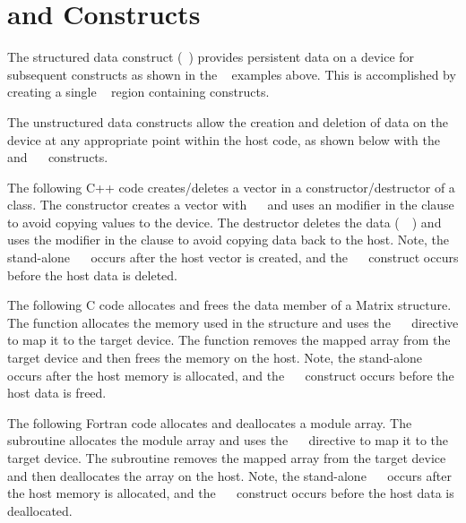 \pagebreak
\section{   and    Constructs}
\label{sec:target_enter_exit_data}

The structured data construct (~) provides persistent data on a
device for subsequent  constructs as shown in the 
~ examples above. This is accomplished by creating a single
~ region containing  constructs.

The unstructured data constructs allow the creation and deletion of data on
the device at any appropriate point within the host code, as shown below 
with the ~~ and ~~ constructs.

The following C++ code creates/deletes a vector in a constructor/destructor 
of a class. The constructor creates a vector with ~~
and uses an  modifier in the  clause to avoid copying values
to the device. The destructor deletes the data (~~)
and uses the  modifier in the  clause to avoid copying data
back to the host. Note, the stand-alone ~~ occurs 
after the host vector is created, and the ~~
construct occurs before the host data is deleted.


The following C code allocates and frees the data member of a Matrix structure.
The  function allocates the memory used in the structure and
uses the ~~ directive to map it to the target device. The
 function removes the mapped array from the target device
and then frees the memory on the host.  Note, the stand-alone 
~~ occurs after the host memory is allocated, and the 
~~ construct occurs before the host data is freed.


The following Fortran code allocates and deallocates a module array.  The
 subroutine allocates the module array and uses the
~~ directive to map it to the target device. The
 subroutine removes the mapped array from the target device and
then deallocates the array on the host.  Note, the stand-alone 
~~ occurs after the host memory is allocated, and the 
~~ construct occurs before the host data is deallocated.


